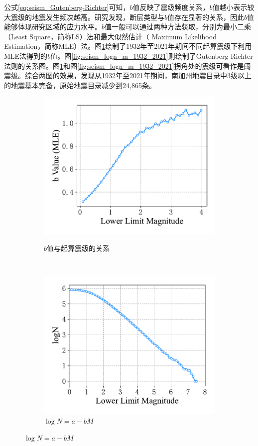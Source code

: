 公式\ref{eq:seism_Gutenberg-Richter}可知，$b$值反映了震级频度关系，$b$值越小表示较大震级的地震发生频次越高。\citet{schorlemmer2005variations}研究发现，断层类型与$b$值存在显著的关系，因此$b$值能够体现研究区域的应力水平。$b$值一般可以通过两种方法获取，分别为最小二乘（Least Square，简称LS）法和最大似然估计（ Maximum Likelihood Estimation，简称MLE）法。图\ref{fig:seism_b_m_1932_2021}绘制了1932年至2021年期间不同起算震级下利用MLE法得到的$b$值。图\ref{fig:seism_logn_m_1932_2021}则绘制了Gutenberg-Richter法则的关系图。图\ref{fig:seism_b_m_1932_2021}和图\ref{fig:seism_logn_m_1932_2021}拐角处的震级可看作是阈震级。综合两图的效果，发现从1932年至2021年期间，南加州地震目录中3级以上的地震基本完备，原始地震目录减少到24,865条。

\begin{figure}[!htbp]
  \centering
  \begin{subfigure}[b]{0.4\textwidth}
    \caption{$b$值与起算震级的关系} 
    \includegraphics[width=\textwidth]{Img/chap5_seism/seism_b_1932_2021.pdf}
    \label{fig:seism_b_m_1932_2021}
  \end{subfigure}   
  ~
  \begin{subfigure}[b]{0.4\textwidth}
      \caption{$\log N=a-bM$}
      \includegraphics[width=\textwidth]{Img/chap5_seism/seism_logN_1932_2021.pdf}

\end{subfigure}
\end{figure}
